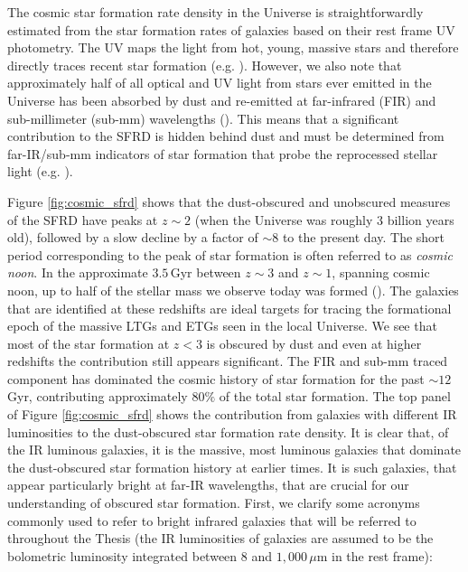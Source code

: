 The cosmic star formation rate density in the Universe is straightforwardly estimated from the star formation rates of galaxies based on their rest frame UV photometry. The UV maps the light from hot, young, massive stars and therefore directly traces recent star formation (e.g. \citealt{Madau_1996, Lilly_1996, Wyder_2005, Schiminovich_2005, Dahlen_2007, Reddy_2009, Robotham_2011, Cucciati_2012, Schenker_2013, Finkelstein_2015}). However, we also note that approximately half of all optical and UV light from stars ever emitted in the Universe has been absorbed by dust and re-emitted at far-infrared (FIR) and sub-millimeter (sub-mm) wavelengths (\citealt{Puget_1996, Fixsen_1998, Dole_2006, Driver_2008, Driver_2016}). This means that a significant contribution to the SFRD is hidden behind dust and must be determined from far-IR/sub-mm indicators of star formation that probe the reprocessed stellar light (e.g. \citealt{Magnelli_2011, Casey_2012, Magnelli_2013, Gruppioni_2013, Swinbank_2014, Bouwens_2016, Bourne_2017, Koprowski_2017, Novak_2017, Liu_2018, Bouwens_2020, Dudzeviciute_2020}).

Figure \ref{fig:cosmic_sfrd} shows that the dust-obscured and unobscured measures of the SFRD have peaks at $z\sim2$ (when the Universe was roughly $3$ billion years old), followed by a slow decline by a factor of $\sim 8$ to the present day. The short period corresponding to the peak of star formation is often referred to as \textit{cosmic noon}. In the approximate $3.5\,$Gyr between $z\sim3$ and $z\sim1$, spanning cosmic noon, up to half of the stellar mass we observe today was formed (\citealt{Forster-Schreiber_2020}). The galaxies that are identified at these redshifts are ideal targets for tracing the formational epoch of the massive LTGs and ETGs seen in the local Universe. We see that most of the star formation at $z < 3$ is obscured by dust and even at higher redshifts the contribution still appears significant. The FIR and sub-mm traced component has dominated the cosmic history of star formation for the past $\sim 12\,$Gyr, contributing approximately $80\%$ of the total star formation. The top panel of Figure \ref{fig:cosmic_sfrd} shows the contribution from galaxies with different IR luminosities to the dust-obscured star formation rate density. It is clear that, of the IR luminous galaxies, it is the massive, most luminous galaxies that dominate the dust-obscured star formation history at earlier times. It is such galaxies, that appear particularly bright at far-IR wavelengths, that are crucial for our understanding of obscured star formation. First, we clarify some acronyms commonly used to refer to bright infrared galaxies that will be referred to throughout the Thesis (the IR luminosities of galaxies are assumed to be the bolometric luminosity integrated between $8$ and $1,000\,\mu$m in the rest frame):

